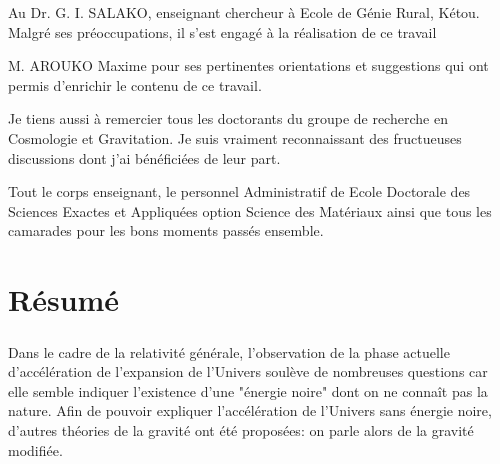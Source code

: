\documentclass[a4paper,12pt]{report}
\theoremstyle{plain}
\theoremstyle{plain}
\begin{document}
Au Dr. G. I. SALAKO, enseignant chercheur à Ecole de Génie Rural, Kétou. Malgré ses préoccupations,	il s’est engagé à la réalisation de ce travail 

M. AROUKO Maxime pour ses pertinentes orientations et suggestions qui ont permis d'enrichir le contenu de ce travail.


Je tiens aussi à remercier tous les doctorants du groupe de recherche en Cosmologie et Gravitation. Je suis vraiment reconnaissant des fructueuses discussions dont j’ai bénéficiées de leur part.

Tout le corps enseignant, le personnel Administratif de Ecole Doctorale des Sciences Exactes et Appliquées option Science des Matériaux ainsi que tous les camarades pour les bons moments passés ensemble.

 
 

\chapter*{R\'esum\'e}
\paragraph{}
Dans le cadre de la relativité générale, l’observation de la phase actuelle d’accélération
de l’expansion de l’Univers soulève de nombreuses questions car elle semble indiquer l’existence d’une "énergie noire" dont on ne connaît pas la nature. Afin de pouvoir expliquer
l’accélération de l’Univers sans énergie noire, d’autres théories de la gravité ont été proposées: on parle alors de la gravité modifiée.
\end{document}
